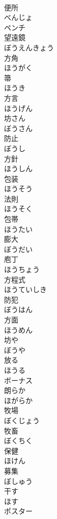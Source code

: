 \documentclass[8pt]{extreport}
\begin{document}
\begin{CJK}{UTF8}{min}
\\	便所 
\\	べんじょ	
\\	ペンチ	
\\	望遠鏡 
\\	ぼうえんきょう	
\\	方角 
\\	ほうがく	
\\	箒 
\\	ほうき	
\\	方言 
\\	ほうげん	
\\	坊さん 
\\	ぼうさん	
\\	防止 
\\	ぼうし	
\\	方針 
\\	ほうしん	
\\	包装 
\\	ほうそう	
\\	法則 
\\	ほうそく	
\\	包帯 
\\	ほうたい	
\\	膨大 
\\	ぼうだい	
\\	庖丁 
\\	ほうちょう	
\\	方程式 
\\	ほうていしき	
\\	防犯 
\\	ぼうはん	
\\	方面 
\\	ほうめん	
\\	坊や 
\\	ぼうや	
\\	放る 
\\	ほうる	
\\	ボーナス	
\\	朗らか 
\\	ほがらか	
\\	牧場 
\\	ぼくじょう	
\\	牧畜 
\\	ぼくちく	
\\	保健 
\\	ほけん	
\\	募集 
\\	ぼしゅう	
\\	干す 
\\	ほす	
\\	ポスター	

\end{CJK}
\end{document}

